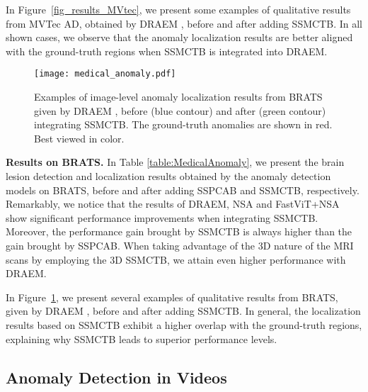 \documentclass[10pt,journal,compsoc]{IEEEtran}
\begin{document}
In Figure~\ref{fig_results_MVtec}, we present some examples of qualitative results from MVTec AD, obtained by DRAEM \cite{Zavrtanik-ICCV-2021}, before and after adding SSMCTB. In all shown cases, we observe that the anomaly localization results are better aligned with the ground-truth regions when SSMCTB is integrated into DRAEM.

\begin{figure}[t!]
\begin{center}
\centerline{\texttt{[image: medical\_anomaly.pdf]}}
\vspace{-0.2cm}
\caption{Examples of image-level anomaly localization results from BRATS given by DRAEM \cite{Zavrtanik-ICCV-2021}, before (blue contour) and after (green contour) integrating SSMCTB. The ground-truth anomalies are shown in red. Best viewed in color.}
\label{fig_results_BraTS}
\vspace{-0.4cm}
\end{center}
\end{figure}

\noindent
\textbf{Results on BRATS.} In Table \ref{table:MedicalAnomaly}, we present the brain lesion detection and localization results obtained by the anomaly detection models \cite{Zavrtanik-ICCV-2021,Schulter-ECCV-2022,Vasu-ICCV-2023} on BRATS, before and after adding SSPCAB and SSMCTB, respectively. Remarkably, we notice that the results of DRAEM, NSA and FastViT+NSA show significant performance improvements when integrating SSMCTB. Moreover, the performance gain brought by SSMCTB is always higher than the gain brought by SSPCAB. When taking advantage of the 3D nature of the MRI scans by employing the 3D SSMCTB, we attain even higher performance with DRAEM. 

In Figure~\ref{fig_results_BraTS}, we present several examples of qualitative results from BRATS, given by DRAEM \cite{Zavrtanik-ICCV-2021}, before and after adding SSMCTB. In general, the localization results based on SSMCTB exhibit a higher overlap with the ground-truth regions, explaining why SSMCTB leads to superior performance levels.

\subsection{Anomaly Detection in Videos}
\end{document}
